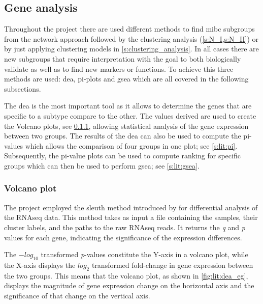 \subsection{Gene analysis} \label{s:lit:gene_analysis}


Throughout the project there are used different methods to find \acrfull{mibc} subgroups from the network approach followed by the clustering analysis (\cref{s:N_I,s:N_II}) or by just applying clustering models in \cref{s:clustering_analysis}. In all cases there are new subgroups that require interpretation with the goal to both biologically validate as well as to find new markers or functions. To achieve this three methods are used: \acrfull{dea}, pi-plots and \acrfull{gsea} which are all covered in the following subsections. 

The \acrshort{dea} is the most important tool as it allows to determine the genes that are specific to a subtype compare to the other. The values derived are used to create the Volcano plots, see \cref{s:lit:dea}, allowing statistical analysis of the gene expression between two groups. The results of the \acrshort{dea} can also be used to compute the pi-values \citep{Xiao2014-zn} which allows the comparison of four groups in one plot; see \cref{s:lit:pi}. Subsequently, the pi-value plots can be used to compute ranking for specific groups which can then be used to perform \acrlong{gsea}; see \cref{s:lit:gsea}.


\subsubsection{Volcano plot} \label{s:lit:dea}


The project employed the sleuth method introduced by \citep{Pimentel2017-xp} for differential analysis of the RNAseq data. This method takes as input a file containing the samples, their cluster labels, and the paths to the raw RNAseq reads. It returns the \textit{q} and \textit{p} values for each gene, indicating the significance of the expression differences.

The $-log_{10}$ transformed \textit{p}-values constitute the Y-axis in a volcano plot, while the X-axis displays the $log_{2}$ transformed fold-change in gene expression between the two groups. This means that the volcano plot, as shown in \cref{fig:lit:dea_eg}, displays the magnitude of gene expression change on the horizontal axis and the significance of that change on the vertical axis.

